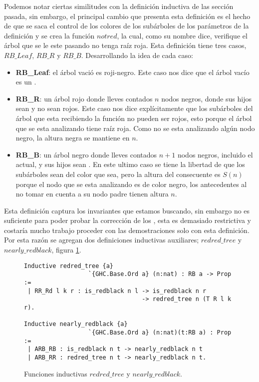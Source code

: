 Podemos notar ciertas similitudes con la definición inductiva de las secci\'on pasada, sin
embargo, el principal cambio que presenta esta definición es el hecho de que se saca el control de
los colores de los subárboles de los parámetros de la definici\'on y se crea la funci\'on $notred$,
la cual, como su nombre dice, verifique el \'arbol que se le este pasando no tenga raíz roja. Esta
definici\'on tiene tres casos,$RB\_Leaf$, $RB\_R$ y $RB\_B$. Desarrollando la idea de cada caso:

\begin{itemize}
        \item \textbf{RB\_Leaf}: el árbol vació es roji-negro. Este caso nos dice que el \'arbol
        vacío es un {\arn}.
        \item \textbf{RB\_R}: un árbol rojo donde lleves contados $n$ nodos negros, donde sus
        hijos sean{\arns} y no sean rojos. Este caso nos dice explícitamente que los subárboles
        del árbol que esta recibiendo la función no pueden ser rojos, esto porque el árbol que se
        esta analizando tiene raíz roja. Como no se esta analizando algún nodo negro, la altura
        negra se mantiene en $n$.
        \item \textbf{RB\_B}: un árbol negro donde lleves contados $n+1$ nodos negros, incluido
        el actual, y sus hijos sean {\arns}. En este ultimo caso se tiene la libertad de que los
        subárboles sean del color que sea, pero la altura del consecuente es $S(n)$ porque el nodo
        que se esta analizando es de color negro, los antecedentes al no tomar en cuenta a su nodo
        padre tienen altura $n$.
\end{itemize}

Esta definici\'on captura los invariantes que estamos buscando, sin embargo no es suficiente para
poder probar la correcci\'on de los {\arns}, esta es demasiado restrictiva y costaría mucho
trabajo proceder con las demostraciones solo con esta definici\'on. Por esta razón se agregan dos
definiciones inductivas auxiliares; $redred\_tree$ y $nearly\_redblack$, figura \ref{inductive_aux}.

\begin{figure}
\centering
\captionsetup{justification=centering}
\begin{verbatim}
Inductive redred_tree {a}
                  `{GHC.Base.Ord a} (n:nat) : RB a -> Prop :=
 | RR_Rd l k r : is_redblack n l -> is_redblack n r
                                 -> redred_tree n (T R l k r).

Inductive nearly_redblack {a}
                  `{GHC.Base.Ord a} (n:nat)(t:RB a) : Prop :=
 | ARB_RB : is_redblack n t -> nearly_redblack n t
 | ARB_RR : redred_tree n t -> nearly_redblack n t.
\end{verbatim}
\caption{Funciones inductivas $redred\_tree$ y $nearly\_redblack$.}
\label{inductive_aux}
\end{figure}

